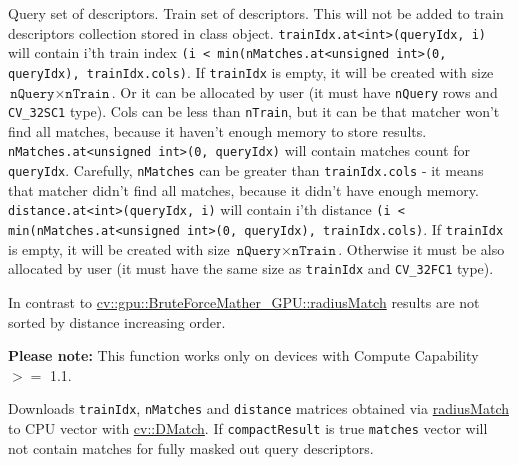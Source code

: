 \begin{description}
 {Query set of descriptors.}
 {Train set of descriptors. This will not be added to train descriptors collection stored in class object.}
 {\texttt{trainIdx.at<int>(queryIdx, i)} will contain i'th train index \newline\texttt{(i < min(nMatches.at<unsigned int>(0, queryIdx), trainIdx.cols)}. If \texttt{trainIdx} is empty, it will be created with size $\texttt{nQuery} \times \texttt{nTrain}$. Or it can be allocated by user (it must have \texttt{nQuery} rows and \texttt{CV\_32SC1} type). Cols can be less than \texttt{nTrain}, but it can be that matcher won't find all matches, because it haven't enough memory to store results.}
 {\texttt{nMatches.at<unsigned int>(0, queryIdx)} will contain matches count for \texttt{queryIdx}. Carefully, \texttt{nMatches} can be greater than \texttt{trainIdx.cols} - it means that matcher didn't find all matches, because it didn't have enough memory.}
 {\texttt{distance.at<int>(queryIdx, i)} will contain i'th distance \newline\texttt{(i < min(nMatches.at<unsigned int>(0, queryIdx), trainIdx.cols)}. If \texttt{trainIdx} is empty, it will be created with size $\texttt{nQuery} \times \texttt{nTrain}$. Otherwise it must be also allocated by user (it must have the same size as \texttt{trainIdx} and \texttt{CV\_32FC1} type).}
\end{description}

In contrast to \hyperref[cppfunc.gpu.BruteForceMatcher.radiusMatch]{cv::gpu::BruteForceMather\_GPU::radiusMatch} results are not sorted by distance increasing order.

\textbf{Please note:} This function works only on devices with Compute Capability $>=$ 1.1.


\label{cppfunc.gpu.BruteForceMatcher.radiusMatchDownload}
Downloads \texttt{trainIdx}, \texttt{nMatches} and \texttt{distance} matrices obtained via \hyperref[cppfunc.gpu.BruteForceMatcher.radiusMatchSingle]{radiusMatch} to CPU vector with \hyperref[cv.class.DMatch]{cv::DMatch}. If \texttt{compactResult} is true \texttt{matches} vector will not contain matches for fully masked out query descriptors.

